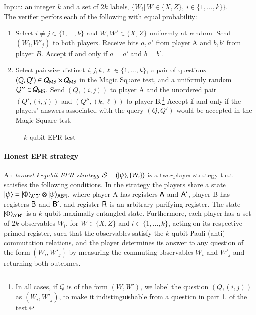 \vspace{10pt}
\begin{center}
\begin{mdframed}
    Input: an integer $k$ and a set of $2k$ labels, $\{W_i|\, W\in\{X,Z\},\,i\in\{1,\ldots,k\}\}$.\\
		The verifier perfors each of the following with equal probability:
		\begin{enumerate}
		\item Select $i\neq j\in\{1,\ldots,k\}$ and $W,W'\in\{X,Z\}$ uniformly at random. Send $(W_i,W'_j)$ to both players. Receive bits $a,a'$ from player A and $b,b'$ from player $B$. Accept if and only if $a=a'$ and $b=b'$.
		\item Select pairwise distinct $i,j,k,\ell\in\{1,\ldots,k\}$, a pair of questions $(Q,Q') \in \mathcal{Q}_{\textsc{MS}}\times\mathcal{Q}_{\textsc{MS}}$ in the Magic Square test, and a uniformly random $Q''\in\mathcal{Q}_{\textsc{MS}}$. Send $(Q,(i,j))$ to player A and the unordered pair $(Q',(i,j))$ and $(Q'',(k,\ell))$ to player B.\footnote{In all cases, if $Q$ is of the form $(W,W')$, we label the question $(Q,(i,j))$ as $(W_i,W'_j)$, to make it indistinguishable from a question in part 1. of the test.} Accept if and only if the players' answers associated with the query $(Q,Q')$ would be accepted in the Magic Square test. 
   \end{enumerate}    
\end{mdframed}
\end{center}
\begin{figure}[H]
\caption{$k$-qubit EPR test~\cite{chao2016test}}
\label{fig:epr_test}
\end{figure}

\paragraph{Honest EPR strategy} An \emph{honest $k$-qubit EPR strategy} $\mathcal{S} = (|\psi\rangle, \{W_i\})$ is a two-player strategy that satisfies the following conditions. In the strategy the players share a state $|\psi\rangle = |\Phi\rangle_{{\textsf{A}}'{\textsf{B}}'} \otimes |\psi\rangle_{{\textsf{ABR}}}$, where player A has registers ${\textsf{A}}$ and ${\textsf{A}}'$, player B has registers ${\textsf{B}}$ and ${\textsf{B}}'$, and register ${\textsf{R}}$ is an arbitrary purifying register. The state $|\Phi\rangle_{{\textsf{A}}'{\textsf{B}}'}$ is a $k$-qubit maximally entangled state. Furthermore, each player has a set of $2k$ observables $W_i$, for $W\in \{X,Z\}$ and $i\in\{1,\ldots,k\}$, acting on its respective primed register, such that the observables satisfy the $k$-qubit Pauli (anti)-commutation relations, and the player determines its answer to any question of the form $(W_i,W'_j)$ by measuring the commuting observables $W_i$ and $W'_j$ and returning both outcomes. 


